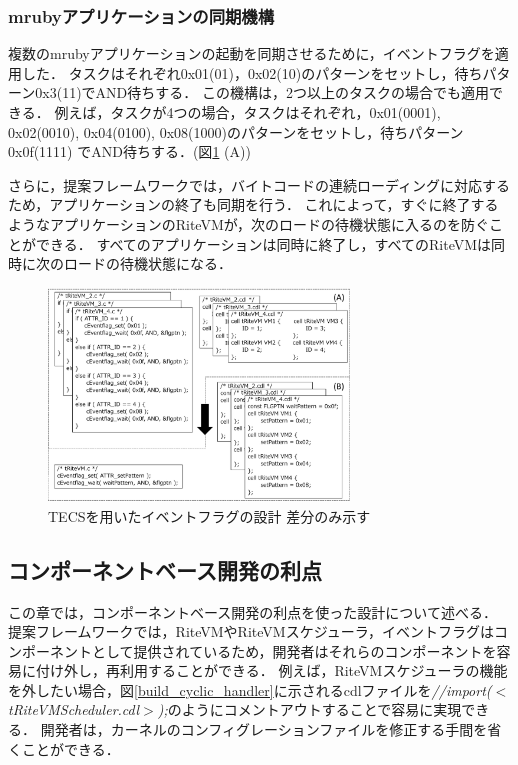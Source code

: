 \documentclass[submit,techrep]{ipsj}
\begin{document}
\subsubsection{mrubyアプリケーションの同期機構}
複数のmrubyアプリケーションの起動を同期させるために，イベントフラグを適用した．
タスクはそれぞれ0x01(01)，0x02(10)のパターンをセットし，待ちパターン0x3(11)でAND待ちする．
この機構は，2つ以上のタスクの場合でも適用できる．
例えば，タスクが4つの場合，タスクはそれぞれ，0x01(0001), 0x02(0010), 0x04(0100), 0x08(1000)のパターンをセットし，待ちパターン0x0f(1111) でAND待ちする．(図\ref{fig:Eventflag} (A))

さらに，提案フレームワークでは，バイトコードの連続ローディングに対応するため，アプリケーションの終了も同期を行う．
これによって，すぐに終了するようなアプリケーションのRiteVMが，次のロードの待機状態に入るのを防ぐことができる．
すべてのアプリケーションは同時に終了し，すべてのRiteVMは同時に次のロードの待機状態になる．

\begin{figure}[t]
    \centering
    \includegraphics[width=8cm,clip]{../EMSOFT2016/figure/Eventflag.pdf}
    \caption{TECSを用いたイベントフラグの設計 {\scriptsize *差分のみ示す}}
\vspace{-2mm}
    \label{fig:Eventflag}
\end{figure}
 
\subsection{コンポーネントベース開発の利点}
この章では，コンポーネントベース開発の利点を使った設計について述べる．
提案フレームワークでは，RiteVMやRiteVMスケジューラ，イベントフラグはコンポーネントとして提供されているため，開発者はそれらのコンポーネントを容易に付け外し，再利用することができる．
例えば，RiteVMスケジューラの機能を外したい場合，図\ref{build_cyclic_handler}に示されるcdlファイルを{\it //import($<$tRiteVMScheduler.cdl$>$);}のようにコメントアウトすることで容易に実現できる．
開発者は，カーネルのコンフィグレーションファイルを修正する手間を省くことができる．
\end{document}
